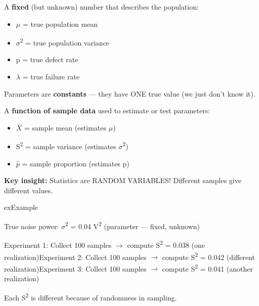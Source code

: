 
A \textbf{fixed} (but unknown) number that describes the population:

\begin{itemize}
\tightlist
\item
  \ensuremath{\mu} = true population mean
\item
  \ensuremath{\sigma}\textsuperscript{2} = true population variance
\item
  p = true defect rate
\item
  \ensuremath{\lambda} = true failure rate
\end{itemize}

Parameters are \textbf{constants} — they have ONE true value (we just don’t know it).


A \textbf{function of sample data} used to estimate or test parameters:

\begin{itemize}
\tightlist
\item
  \ensuremath{\bar{X}} = sample mean (estimates \ensuremath{\mu})
\item
  S\textsuperscript{2} = sample variance (estimates \ensuremath{\sigma}\textsuperscript{2})
\item
  \ensuremath{\hat{p}} = sample proportion (estimates p)
\end{itemize}

\begin{PSquote}

\PSwarn{} \textbf{Key insight:} Statistics are RANDOM VARIABLES! Different samples give different values.

\end{PSquote}

\begin{PSbox}[unbreakable]{ex}{Example}

True noise power: \ensuremath{\sigma}\textsuperscript{2} = 0.04 V\textsuperscript{2} (parameter — fixed, unknown)

Experiment 1: Collect 100 samples \ensuremath{\to} compute S\textsuperscript{2} = 0.038 (one realization)\PSbr{}Experiment 2: Collect 100 samples \ensuremath{\to} compute S\textsuperscript{2} = 0.042 (different realization)\PSbr{}Experiment 3: Collect 100 samples \ensuremath{\to} compute S\textsuperscript{2} = 0.041 (another realization)

Each S\textsuperscript{2} is different because of randomness in sampling.

\end{PSbox}


